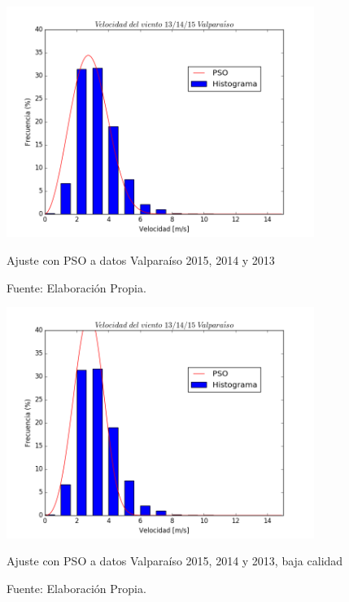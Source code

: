 
\begin{figure}[h!]
    \centering
    \includegraphics[height=75mm]{figures/result_13-14-15.png}
    \caption{Ajuste con PSO a datos Valparaíso 2015, 2014 y 2013}
    \vspace{-.25cm}
    \caption*{Fuente: Elaboración Propia.}
    \label{fig:pso_valpo_15_14_13}
\end{figure}
\begin{figure}[h!]
    \centering
    \includegraphics[height=75mm]{figures/result_13-14-15_low_quality.png}
    \caption{Ajuste con PSO a datos Valparaíso 2015, 2014 y 2013, baja calidad}
    \vspace{-.25cm}
    \caption*{Fuente: Elaboración Propia.}
    \label{fig:pso_valpo_15_14_13_lq}
\end{figure}
